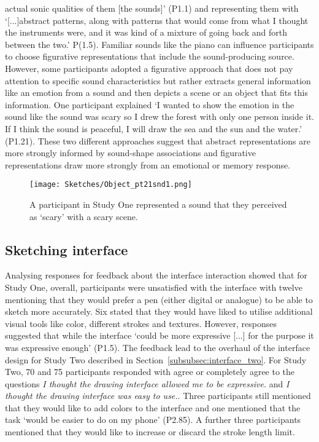 \documentclass[]{interact}
\theoremstyle{plain}%
\theoremstyle{definition}
\theoremstyle{remark}
\begin{document}
actual sonic qualities of them [the sounds]' (P1.1) and representing them with `[...]abstract patterns, along with patterns that would come from what I thought the instruments were, and it was kind of a mixture of going back and forth between the two.' P(1.5). Familiar sounds like the piano can influence participants to choose figurative representations that include the sound-producing source. However, some participants adopted a figurative approach that does not pay attention to specific sound characteristics but rather extracts general information like an emotion from a sound and then depicts a scene or an object that fits this information. One participant explained `I wanted to show the emotion in the sound like the sound was scary so I drew the forest with only one person inside it. If I think the sound is peaceful, I will draw the sea and the sun and the water.' (P1.21). These two different approaches suggest that abstract representations are more strongly informed by sound-shape associations and figurative representations draw more strongly from an emotional or memory response. 

\begin{figure}[h]
\centering
\texttt{[image: Sketches/Object\_pt21snd1.png]}
\caption{A participant in Study One represented a sound that they perceived as `scary' with a scary scene.  \label{fig:scary_scene}}
\end{figure}

\subsection{Sketching interface}
Analysing responses for feedback about the interface interaction showed that for Study One, overall, participants were unsatisfied with the interface with twelve mentioning that they would prefer a pen (either digital or analogue) to be able to sketch more accurately. Six stated that they would have liked to utilise additional visual tools like color, different strokes and textures. However, responses suggested that while the interface `could be more expressive [...] for the purpose it was expressive
enough' (P1.5). The feedback lead to the overhaul of the interface design for Study Two described in Section~\ref{subsubsec:interface_two}. For Study Two, 70 and 75 participants responded with agree or completely agree to the questions \textit{I thought the drawing interface allowed me to be expressive.} and \textit{I thought the drawing interface was easy to use.}. Three participants still mentioned that they would like to add colors to the interface and one mentioned that the task `would be easier to do on my phone' (P2.85). A further three participants mentioned that they would like to increase or discard the stroke length limit.   
\end{document}
